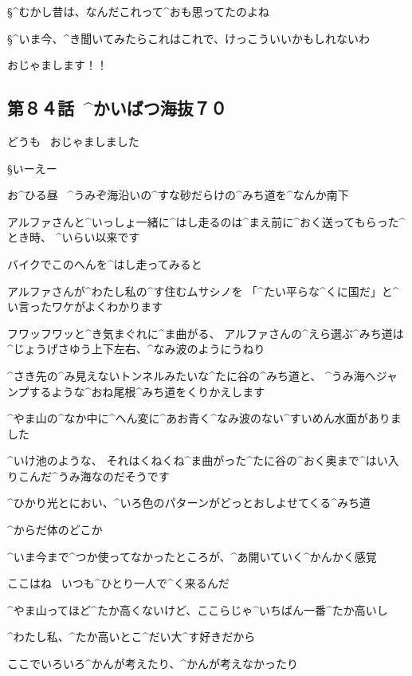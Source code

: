 \S ^{むかし}{昔}は、なんだこれって^{おも}{思}ってたのよね

\S ^{いま}{今}、^{き}{聞}いてみたらこれはこれで、けっこういいかもしれないわ

\page
\A おじゃまします！！


\subsection{第８４話\ ^{かいばつ}{海抜}７０}

\page[96]
\K どうも
\ おじゃましました

\S いーえー

\page
\K お^{ひる}{昼}
\ ^{うみぞ}{海沿}いの^{すな}{砂}だらけの^{みち}{道}を^{なんか}{南下}

\K アルファさんと^{いっしょ}{一緒}に^{はし}{走}るのは^{まえ}{前}に^{おく}{送}ってもらった^{とき}{時}、
^{いらい}{以来}です

\page
\K バイクでこのへんを^{はし}{走}ってみると

\K アルファさんが^{わたし}{私}の^{す}{住}むムサシノを
「^{たい}{平}らな^{くに}{国}だ」と^{い}{言}ったワケがよくわかります

\page
\K フワッフワッと^{き}{気}まぐれに^{ま}{曲}がる、
アルファさんの^{えら}{選}ぶ^{みち}{道}は^{じょうげさゆう}{上下左右}、^{なみ}{波}のようにうねり

\K ^{さき}{先}の^{み}{見}えないトンネルみたいな^{たに}{谷}の^{みち}{道}と、
^{うみ}{海}へジャンプするような^{おね}{尾根}^{みち}{道}をくりかえします

\page
\K ^{やま}{山}の^{なか}{中}に^{へん}{変}に^{あお}{青}く^{なみ}{波}のない^{すいめん}{水面}がありました

\K ^{いけ}{池}のような、
それはくねくね^{ま}{曲}がった^{たに}{谷}の^{おく}{奥}まで^{はい}{入}りこんだ^{うみ}{海}なのだそうです

\K ^{ひかり}{光}とにおい、^{いろ}{色}のパターンがどっとおしよせてくる^{みち}{道}

\page
\K ^{からだ}{体}のどこか

\K ^{いま}{今}まで^{つか}{使}ってなかったところが、^{あ}{開}いていく^{かんかく}{感覚}

\page[103]
\A ここはね
\ いつも^{ひとり}{一人}で^{く}{来}るんだ

\A ^{やま}{山}ってほど^{たか}{高}くないけど、ここらじゃ^{いちばん}{一番}^{たか}{高}いし

\A ^{わたし}{私}、^{たか}{高}いとこ^{だい}{大}^{す}{好}きだから

\A ここでいろいろ^{かんが}{考}えたり、^{かんが}{考}えなかったり

